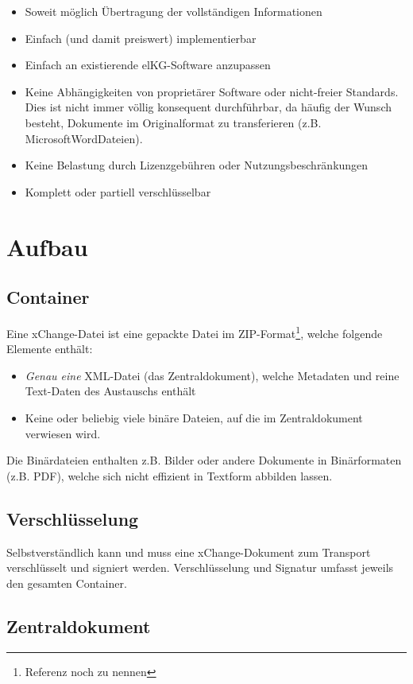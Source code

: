 \documentclass[a4paper]{scrartcl}
\begin{document}
\begin{itemize}
  \item Soweit möglich Übertragung der vollständigen Informationen
  \item Einfach (und damit preiswert) implementierbar
  \item Einfach an existierende elKG-Software anzupassen
  \item Keine Abhängigkeiten von proprietärer Software oder nicht-freier Standards. Dies ist nicht immer völlig konsequent durchführbar, da häufig der Wunsch besteht, Dokumente im Originalformat zu transferieren (z.B. Microsoft\texttrademark Word\texttrademark Dateien).
  \item Keine Belastung durch Lizenzgebühren oder Nutzungsbeschränkungen
  \item Komplett oder partiell verschlüsselbar
\end{itemize}

\section{Aufbau}
\subsection{Container}
Eine xChange-Datei ist eine gepackte Datei im ZIP-Format\footnote{Referenz noch zu nennen}, welche folgende Elemente enthält:
\begin{itemize}
\item \textit{Genau eine} XML-Datei (das Zentraldokument), welche Metadaten und reine Text-Daten des Austauschs enthält
\item Keine oder beliebig viele binäre Dateien, auf die im Zentraldokument verwiesen wird.
\end{itemize}
Die Binärdateien enthalten z.B. Bilder oder andere Dokumente in Binärformaten (z.B. PDF), welche sich nicht effizient in Textform abbilden lassen.

\subsection{Verschlüsselung}
Selbstverständlich kann und muss eine xChange-Dokument zum Transport verschlüsselt und signiert werden. Verschlüsselung und Signatur umfasst jeweils den gesamten Container.

\subsection{Zentraldokument}
\end{document}
